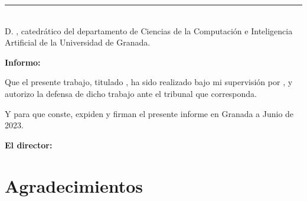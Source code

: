 \cleardoublepage

\thispagestyle{empty}

\noindent\rule[-1ex]{\textwidth}{2pt}\\[4.5ex]

D. \textbf{\tutor}, catedrático del departamento de Ciencias de la
Computación e Inteligencia Artificial de la Universidad de Granada.

\vspace{0.5cm}

\textbf{Informo:}

\vspace{0.5cm}

Que el presente trabajo, titulado \textit{\textbf{\titulo}},
ha sido realizado bajo mi supervisión por \textbf{\minombre}, y autorizo la defensa de dicho trabajo ante el tribunal
que corresponda.

\vspace{0.5cm}

Y para que conste, expiden y firman el presente informe en Granada a Junio de 2023.

\vspace{1cm}

\textbf{El director: }

\vspace{5cm}

\noindent \textbf{\tutor}

\chapter*{Agradecimientos}




